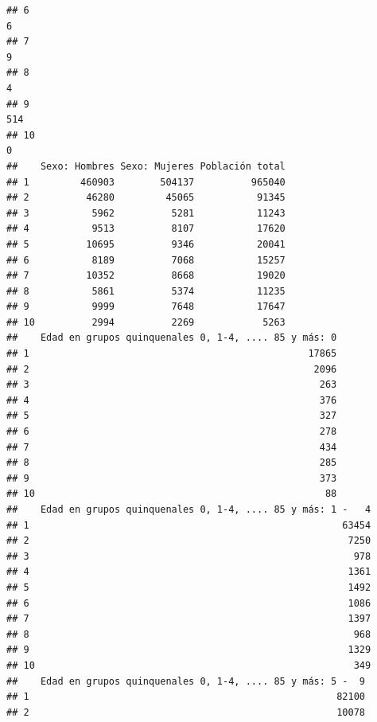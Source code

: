 \documentclass[11pt,]{article}
\begin{document}
\begin{verbatim}
## 6                                                                                                6
## 7                                                                                                9
## 8                                                                                                4
## 9                                                                                              514
## 10                                                                                               0
##    Sexo: Hombres Sexo: Mujeres Población total
## 1         460903        504137          965040
## 2          46280         45065           91345
## 3           5962          5281           11243
## 4           9513          8107           17620
## 5          10695          9346           20041
## 6           8189          7068           15257
## 7          10352          8668           19020
## 8           5861          5374           11235
## 9           9999          7648           17647
## 10          2994          2269            5263
##    Edad en grupos quinquenales 0, 1-4, .... 85 y más: 0
## 1                                                 17865
## 2                                                  2096
## 3                                                   263
## 4                                                   376
## 5                                                   327
## 6                                                   278
## 7                                                   434
## 8                                                   285
## 9                                                   373
## 10                                                   88
##    Edad en grupos quinquenales 0, 1-4, .... 85 y más: 1 -   4
## 1                                                       63454
## 2                                                        7250
## 3                                                         978
## 4                                                        1361
## 5                                                        1492
## 6                                                        1086
## 7                                                        1397
## 8                                                         968
## 9                                                        1329
## 10                                                        349
##    Edad en grupos quinquenales 0, 1-4, .... 85 y más: 5 -  9
## 1                                                      82100
## 2                                                      10078

\end{verbatim}
\end{document}
